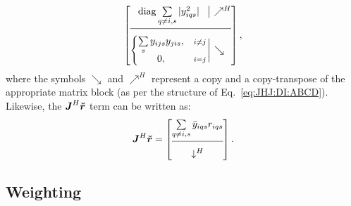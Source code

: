 \documentclass[useAMS,usenatbib]{mn2e}
\makeatletter
\newcommand{\II}{\mathbb{I}}
\newcommand{\mat}[1]{{\bmath{#1}}}
\newcommand{\JJ}{\mat{J}} %
\newcommand{\Matrix}[2]{\left [ \begin{array}{@{}#1@{}}#2\end{array} \right ]}
\newcommand{\Stack}[1]{\begin{array}{@{}c@{}}#1\end{array}}
\newcommand{\AUG}[1]{\bmath{\breve{#1}}}
\newcommand{\Zz}{\AUG{z}}
\newcommand{\Rr}{\AUG{r}}
\numberwithin{equation}{section} %
\providecommand{\DIFaddbegin}{} %
\providecommand{\DIFdelend}{} %
\makeatother
\begin{document}


\begin{equation}%
\DIFdelend \DIFaddbegin \JHJblocks{
  \mathrm{diag} \sum\limits_{q\ne i,s} |y^2_{iqs}| 
}{
  \left \{ 
  \begin{array}{@{}cc@{}}
   \sum\limits_{s} y_{ijs}y_{jis},&{\scriptstyle i\ne j} \\
   0, &{\scriptstyle i=j}
  \end{array} \right . 
},
\end{equation}
where the symbols $\searrow$ and $\nearrow^H$ represent a copy and a copy-transpose of the appropriate matrix 
block (as per the structure of Eq.~\ref{eq:JHJ:DI:ABCD}). Likewise, the $\JJ^H\Rr$ term can be written as:
\begin{equation}
\label{eq:JHR:DI:tf}
\JJ^H\Rr 
= \Matrix{c}{
\sum\limits_{q\ne i,s} \bar{y}_{iqs} r_{iqs}   \\
 \hline \\[-8pt]
\downarrow^H
}.
\end{equation}

\subsection{Weighting}
\label{sec:DI:W}
\end{document}
